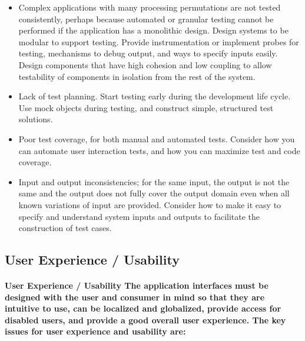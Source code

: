\documentclass[../Psychological_system_web_application.tex]{subfiles}
\begin{document}
					\begin{itemize}
						\item
							Complex applications with many processing permutations are not tested consistently, perhaps because automated or granular testing cannot be performed if the application has a monolithic design. Design systems to be modular to support testing. Provide instrumentation or implement probes for testing, mechanisms to debug output, and ways to specify inputs easily. Design components that have high cohesion and low coupling to allow testability of components in isolation from the rest of the system.
						\item
							Lack of test planning. Start testing early during the development life cycle. Use mock objects during testing, and construct simple, structured test solutions.
						\item
							Poor test coverage, for both manual and automated tests. Consider how you can automate user interaction tests, and how you can maximize test and code coverage.
						\item
							Input and output inconsistencies; for the same input, the output is not the same and the output does not fully cover the output domain even when all known variations of input are provided. Consider how to make it easy to specify and understand system inputs and outputs to facilitate the construction of test cases.
						
					\end{itemize}
					
					
				\subsection{User Experience / Usability}
				
					\paragraph{\gls{User Experience / Usability} The application interfaces must be designed with the user and consumer in mind so that they are intuitive to use, can be localized and globalized, provide access for disabled users, and provide a good overall user experience. The key issues for user experience and usability are:}
					
\end{document}
